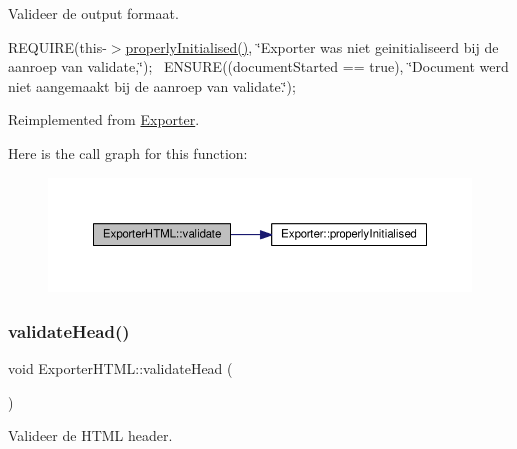 Valideer de output formaat. 

R\+E\+Q\+U\+I\+RE(this-\/$>$\hyperlink{class_exporter_aafd9df9210aeefd7bb7fd434fc317cf0}{properly\+Initialised()}, \char`\"{}\+Exporter was niet geinitialiseerd bij de aanroep van validate,\char`\"{});~\newline
E\+N\+S\+U\+RE((document\+Started == true), \char`\"{}\+Document werd niet aangemaakt bij de aanroep van validate.\char`\"{});~\newline


Reimplemented from \hyperlink{class_exporter_a190fe737bcda2a55707ae51b731d11a5}{Exporter}.

Here is the call graph for this function\+:
\nopagebreak
\begin{figure}[H]
\begin{center}
\leavevmode
\includegraphics[width=350pt]{class_exporter_h_t_m_l_a60518b938e3cddd92ce3218de3651ac4_cgraph}
\end{center}
\end{figure}
\mbox{\label{class_exporter_h_t_m_l_a2d9bb5e5f68a9e6111d8a929eb4a042e}} 
\subsubsection{\texorpdfstring{validate\+Head()}{validateHead()}}
{\footnotesize\ttfamily void Exporter\+H\+T\+M\+L\+::validate\+Head (\begin{DoxyParamCaption}{ }\end{DoxyParamCaption})}



Valideer de H\+T\+ML header. 

